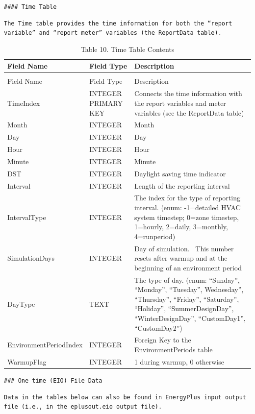 \begin{lstlisting}
#### Time Table
\end{lstlisting}

\begin{lstlisting}
The Time table provides the time information for both the “report variable” and “report meter” variables (the ReportData table).
\end{lstlisting}

\begin{longtable}[c]{p{1.5in}p{1.5in}p{3.0in}}
\caption{Table 10. Time Table Contents \label{table:table-10.-time-table-contents}} \tabularnewline
\toprule 
Field Name & Field Type & Description \tabularnewline
\midrule
\endfirsthead

\caption[]{Table 10. Time Table Contents} \tabularnewline
\toprule 
Field Name & Field Type & Description \tabularnewline
\midrule
\endhead

TimeIndex & INTEGER PRIMARY KEY & Connects the time information with the report variables and meter variables (see the ReportData table) \tabularnewline
Month & INTEGER & Month \tabularnewline
Day & INTEGER & Day \tabularnewline
Hour & INTEGER & Hour \tabularnewline
Minute & INTEGER & Minute \tabularnewline
DST & INTEGER & Daylight saving time indicator \tabularnewline
Interval & INTEGER & Length of the reporting interval \tabularnewline
IntervalType & INTEGER & The index for the type of reporting interval. (enum: -1=detailed HVAC system timestep; 0=zone timestep, 1=hourly, 2=daily, 3=monthly, 4=runperiod) \tabularnewline
SimulationDays & INTEGER & Day of simulation.~ This number resets after warmup and at the beginning of an environment period \tabularnewline
DayType & TEXT & The type of day. (enum: “Sunday”, “Monday”, “Tuesday”, Wednesday”, “Thursday”, “Friday”, “Saturday”, “Holiday”, “SummerDesignDay”, “WinterDesignDay”, “CustomDay1”, “CustomDay2”) \tabularnewline
EnvironmentPeriodIndex & INTEGER & Foreign Key to the EnvironmentPeriods table \tabularnewline
WarmupFlag & INTEGER & 1 during warmup, 0 otherwise \tabularnewline
\bottomrule
\end{longtable}

\begin{lstlisting}
### One time (EIO) File Data
\end{lstlisting}

\begin{lstlisting}
Data in the tables below can also be found in EnergyPlus input output file (i.e., in the eplusout.eio output file).
\end{lstlisting}

